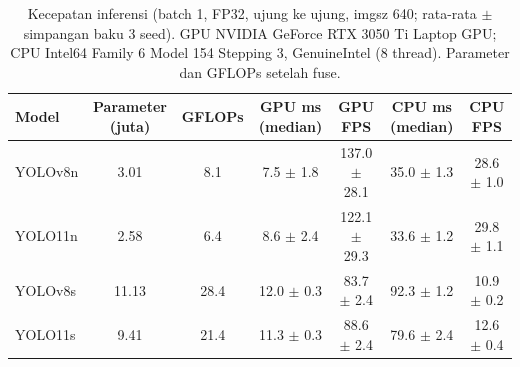 \begin{table}[!t]
\centering
\caption{Kecepatan inferensi (batch 1, FP32, ujung ke ujung, imgsz 640; rata-rata $\pm$ simpangan baku 3 seed). GPU NVIDIA GeForce RTX 3050 Ti Laptop GPU; CPU Intel64 Family 6 Model 154 Stepping 3, GenuineIntel (8 thread). Parameter dan GFLOPs setelah fuse.}
\label{tab:kecepatan}
\footnotesize
\begin{tabular}{lcccccc}
\hline
\textbf{Model} & \textbf{Parameter (juta)} & \textbf{GFLOPs} & \textbf{GPU ms (median)} & \textbf{GPU FPS} & \textbf{CPU ms (median)} & \textbf{CPU FPS} \\
\hline
YOLOv8n & 3.01 & 8.1 & 7.5 $\pm$ 1.8 & 137.0 $\pm$ 28.1 & 35.0 $\pm$ 1.3 & 28.6 $\pm$ 1.0 \\
YOLO11n & 2.58 & 6.4 & 8.6 $\pm$ 2.4 & 122.1 $\pm$ 29.3 & 33.6 $\pm$ 1.2 & 29.8 $\pm$ 1.1 \\
YOLOv8s & 11.13 & 28.4 & 12.0 $\pm$ 0.3 & 83.7 $\pm$ 2.4 & 92.3 $\pm$ 1.2 & 10.9 $\pm$ 0.2 \\
YOLO11s & 9.41 & 21.4 & 11.3 $\pm$ 0.3 & 88.6 $\pm$ 2.4 & 79.6 $\pm$ 2.4 & 12.6 $\pm$ 0.4 \\
\hline
\end{tabular}
\end{table}
